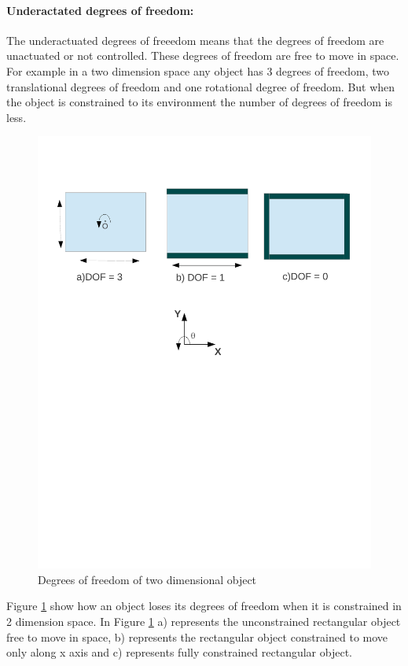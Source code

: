  \paragraph{Underactated degrees of freedom:}
    The underactuated degrees of freeedom means that the degrees of freedom are unactuated or not controlled. These degrees of freedom are free to move in space. For example in a two dimension space any object has 3 degrees of freedom, two translational degrees of freedom and one rotational degree of freedom. But when the object is constrained to its environment the number of degrees of freedom is less.
    \begin{figure}[H]
    \begin{center}
    \includegraphics[trim = 10mm 130mm 10mm 20mm, scale = 0.75 ]{Bilder/dof2d.pdf}
    \caption{ Degrees of freedom of two dimensional object}
    \label{fig:dof_2d}
    \end{center}
    \end{figure}
    Figure \ref{fig:dof_2d} show how an object loses its degrees of freedom when it is constrained in 2 dimension space. In Figure \ref{fig:dof_2d} a) represents the unconstrained rectangular object free to move in space, b) represents the rectangular object constrained to move only along x axis and c) represents fully constrained rectangular object. 
    
